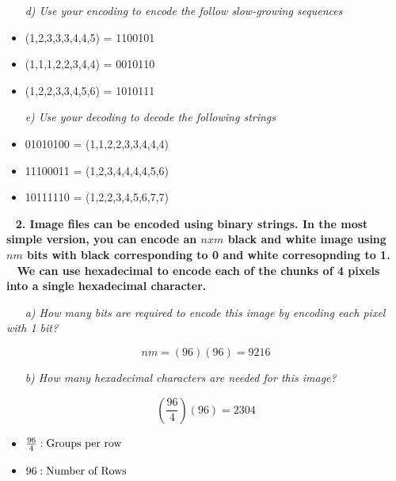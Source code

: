 \documentclass[12pt, letterpaper]{article}
\begin{document}
\-\ \newline
\-\ \it{ d) Use your encoding to encode the follow slow-growing sequences }
\-\ \newline
\begin{itemize}
\item (1,2,3,3,3,4,4,5)
\textnormal{ = 1100101}

\item (1,1,1,2,2,3,4,4)
\textnormal{ = 0010110}

\item (1,2,2,3,3,4,5,6)
\textnormal{ = 1010111}
\end{itemize}

\-\ \newline
\-\ \it{ e) Use your decoding to decode the following strings }
\begin{itemize} 
\item \textnormal{01010100}
\textnormal{ = (1,1,2,2,3,3,4,4,4)}
\item \textnormal{11100011}
\textnormal{ = (1,2,3,4,4,4,4,5,6) }
\item \textnormal{10111110}
\textnormal{ = (1,2,2,3,4,5,6,7,7) }
\end{itemize}


\newpage
\-\ \newline
\bf{ 2. Image files can be encoded using binary strings. In the most simple version, you can encode an \(n x m\) black and white image using \(nm\) bits with black corresponding to 0 and white corresopnding to 1. }
\-\ \newline
\-\ \newline
\bf{ We can use hexadecimal to encode each of the chunks of 4 pixels into a single hexadecimal character. }

\-\ \newline
\-\ \it{ a) How many bits are required to encode this image by encoding each pixel with 1 bit? }

\[nm = (96)(96) = 9216\]



\-\ \newline
\-\ \it{ b) How many hexadecimal characters are needed for this image? }

\[ \left(\frac{96}{4}\right)(96) = 2304 \]

\begin{itemize}
\item \( \frac{96}{4} : \textnormal{Groups per row}\)
\item \( 96 : \textnormal{Number of Rows}\)
\end{itemize}
\end{document}
